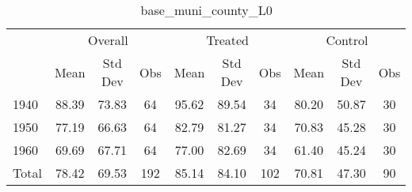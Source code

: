 \begin{table}[htbp]\centering
\def\sym#1{\ifmmode^{#1}\else\(^{#1}\)\fi}
\caption{base\_muni\_county\_L0 \label{tab1}}
\begin{tabular}{l*{3}{ccc}}
\toprule
                    &\multicolumn{3}{c}{Overall}           &\multicolumn{3}{c}{Treated}           &\multicolumn{3}{c}{Control}           \\
                    &        Mean&     Std Dev&         Obs&        Mean&     Std Dev&         Obs&        Mean&     Std Dev&         Obs\\
\midrule
1940                &       88.39&       73.83&          64&       95.62&       89.54&          34&       80.20&       50.87&          30\\
1950                &       77.19&       66.63&          64&       82.79&       81.27&          34&       70.83&       45.28&          30\\
1960                &       69.69&       67.71&          64&       77.00&       82.69&          34&       61.40&       45.24&          30\\
Total               &       78.42&       69.53&         192&       85.14&       84.10&         102&       70.81&       47.30&          90\\
\bottomrule
\end{tabular}
\end{table}

